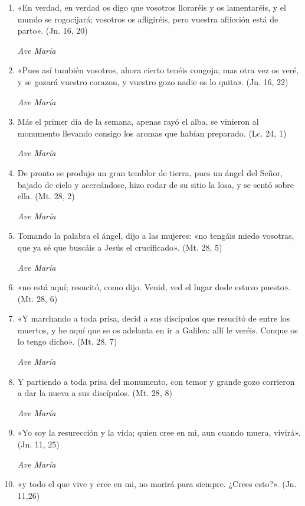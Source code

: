 \documentclass[a4paper,11pt, oneside]{report}
\begin{document}
        \begin{enumerate}
          
          \item «En verdad, en verdad os digo que vosotros lloraréis y os lamentaréis, y el mundo se rogocijará;
          vosotros os afligiréis, pero vuestra aflicción está de parto». (Jn. 16, 20)

          \textit{Ave María}

          \item «Pues así también vosotros, ahora cierto tenéis congoja; mas otra vez os veré, y se gozará vuestro corazon,
          y vuestro gozo nadie os lo quita». (Jn. 16, 22)

          \textit{Ave María}

          \item Más el primer día de la semana, apenas rayó el alba, se vinieron al monumento llevando consigo los aromas
          que habían preparado. (Lc. 24, 1)

          \textit{Ave María}

          \item De pronto se produjo un gran temblor de tierra, pues un ángel del Señor, bajado de cielo y acercándose, hizo rodar
          de su sitio la losa, y se sentó sobre ella. (Mt. 28, 2)
          
          \textit{Ave María}

          \item Tomando la palabra el ángel, dijo a las mujeres: «no tengáis miedo vosotras, que ya sé que buscáis a Jesús el crucificado». (Mt. 28, 5)

          \textit{Ave María}

          \item «no está aquí; resucitó, como dijo. Venid, ved el lugar dode estuvo puesto». (Mt. 28, 6)

          \item «Y marchando a toda prisa, decid a sus discípulos que resucitó de entre los muertos, y he aquí que se os adelanta en ir a Galilea:
          allí le veréis. Conque os lo tengo dicho». (Mt. 28, 7)

          \textit{Ave María}

          \item Y partiendo a toda prisa del monumento, con temor y grande gozo corrieron a dar la nueva a sus discípulos. (Mt. 28, 8)

          \textit{Ave María}

          \item «Yo soy la resurección y la vida; quien cree en mi, aun cuando muera, vivirá». (Jn. 11, 25)

          \textit{Ave María}

          \item «y todo el que vive y cree en mi, no morirá para siempre. ¿Crees esto?». (Jn. 11,26)
          
        \end{enumerate}
\end{document}
